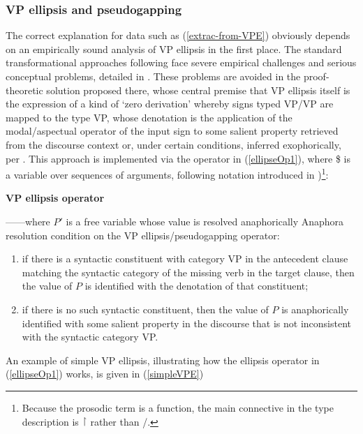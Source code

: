 \documentclass[output=paper,colorlinks,citecolor=brown]{langscibook}
\begin{document}
\subsubsection{VP ellipsis and pseudogapping}\label{subsubsec:VPE}

The correct explanation for data such as (\ref{extrac-from-VPE}) obviously
depends on an empirically sound analysis of VP ellipsis in the first
place. The standard transformational approaches following \citet{kuno1981}
face severe empirical challenges and serious conceptual problems,
detailed in \citet{kubota-levine-pseudo}. These problems are avoided in the
proof-theoretic solution proposed there, whose central premise that VP
ellipsis itself is the expression of a kind of `zero derivation'
whereby signs typed VP/VP are mapped to the type VP, whose denotation
is the application of the modal/aspectual operator of the input sign
to some salient property retrieved from the discourse context or,
under certain conditions, inferred exophorically, per
\citet{MillerPullum13}. This approach is implemented via the operator in
(\ref{ellipseOp1}), where \$ is a variable over sequences of arguments,
following notation introduced in \citet{steedman2000a})\footnote{Because the
prosodic term is a function, the main connective in the type
description is \ensuremath{\vs} rather than /.}:

\begin{exe}
 \ex\label{ellipseOp1}
  \textbf{VP ellipsis operator} \\

  ------where $P'$ is a free variable whose value is
  resolved anaphorically
 \ex\label{Acondition}
  Anaphora resolution condition on the VP ellipsis/pseudogapping
  operator:
  \begin{enumerate}
   \item
    if there is a syntactic  constituent
    with category VP in the antecedent clause matching the
    syntactic  category of the missing verb in the target clause,
    then the value of $P$ is identified with the denotation of that constituent;
   \item
    if there is no such syntactic  constituent, then the value of $P$  is anaphorically
    identified with some salient property in the discourse that is not
    inconsistent with the syntactic  category VP.
  \end{enumerate}
\end{exe}
An example of simple VP ellipsis, illustrating how the ellipsis operator
in (\ref{ellipseOp1}) works, is given in (\ref{simpleVPE})
\end{document}
